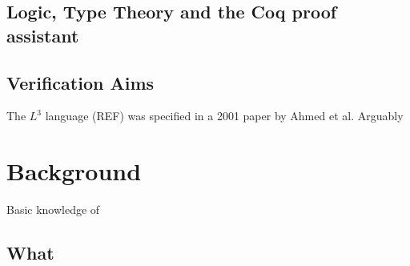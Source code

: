 \documentclass[]{unswthesis}
\begin{document}
\section{Logic, Type Theory and the Coq proof assistant}

\section{Verification Aims}

The $L^3$ language (REF) was specified in a 2001 paper by Ahmed et al. Arguably 

\chapter{Background}
\label{ch:intro}

Basic knowledge of

\section{What}

%
% 
%
%
%

\backmatter



%
%
\end{document}
